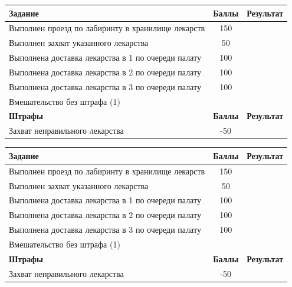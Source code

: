\documentclass[12pt]{article}
\newcommand{\penaltyOne}{\color{red}-50}
\newcommand{\namePenaltyOne}{Захват неправильного лекарства}
\newcommand{\taskOne}{150}
\newcommand{\nameTaskOne}{Выполнен проезд по лабиринту в хранилище лекарств}
\newcommand{\taskSecond}{50}
\newcommand{\nameTaskSecond}{Выполнен захват указанного лекарства}
\newcommand{\taskThird}{100}
\newcommand{\nameTaskThird}{Выполнена доставка лекарства в 1 по очереди палату}
\newcommand{\taskFourth}{100}
\newcommand{\nameTaskFourth}{Выполнена доставка лекарства в 2 по очереди палату}
\newcommand{\taskFifth}{100}
\newcommand{\nameTaskFifth}{Выполнена доставка лекарства в 3 по очереди палату}
\begin{document}
\vspace*{0.25cm}
\begin{tabularx}{\textwidth}{|X|c|p{2cm}|}
    \hline
    \textbf{Задание} & \textbf{Баллы} & \textbf{Результат}\\
    \hline
    \nameTaskOne & \taskOne &  \\
    \hline
    \nameTaskSecond & \taskSecond & \\
    \hline
    \nameTaskThird & \taskThird & \\
    \hline 
    \nameTaskFourth & \taskFourth & \\
    \hline
    \nameTaskFifth & \taskFifth & \\
    \hline
    Вмешательство без штрафа (1) &  \\
    \hline
    \textbf{Штрафы} & \textbf{Баллы} & \textbf{Результат} \\
    \hline
    \namePenaltyOne & \penaltyOne &  \\
    \hline
\end{tabularx}
\vspace*{0.25cm}

\vspace*{0.25cm}
\begin{tabularx}{\textwidth}{|X|c|p{2cm}|}
    \hline
    \textbf{Задание} & \textbf{Баллы} & \textbf{Результат}\\
    \hline
    \nameTaskOne & \taskOne &  \\
    \hline
    \nameTaskSecond & \taskSecond & \\
    \hline
    \nameTaskThird & \taskThird & \\
    \hline 
    \nameTaskFourth & \taskFourth & \\
    \hline
    \nameTaskFifth & \taskFifth & \\
    \hline
    Вмешательство без штрафа (1) &  \\
    \hline
    \textbf{Штрафы} & \textbf{Баллы} & \textbf{Результат} \\
    \hline
    \namePenaltyOne & \penaltyOne &  \\
    \hline
\end{tabularx}
\vspace*{1cm}

\end{document}

